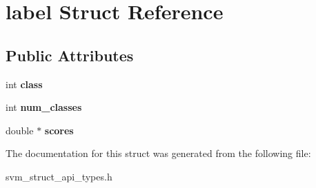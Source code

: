 \hypertarget{structlabel}{}\section{label Struct Reference}
\label{structlabel}
\subsection*{Public Attributes}
\begin{DoxyCompactItemize}
\item 
\hypertarget{structlabel_a2ac450881f3f6a3aa15d40279ebd66c1}{}int {\bfseries class}\label{structlabel_a2ac450881f3f6a3aa15d40279ebd66c1}

\item 
\hypertarget{structlabel_adde745692ed40897157bce547e21c96a}{}int {\bfseries num\+\_\+classes}\label{structlabel_adde745692ed40897157bce547e21c96a}

\item 
\hypertarget{structlabel_af790de47a3c9662cf962df15ff4d1191}{}double $\ast$ {\bfseries scores}\label{structlabel_af790de47a3c9662cf962df15ff4d1191}

\end{DoxyCompactItemize}


The documentation for this struct was generated from the following file\+:\begin{DoxyCompactItemize}
\item 
svm\+\_\+struct\+\_\+api\+\_\+types.\+h\end{DoxyCompactItemize}
